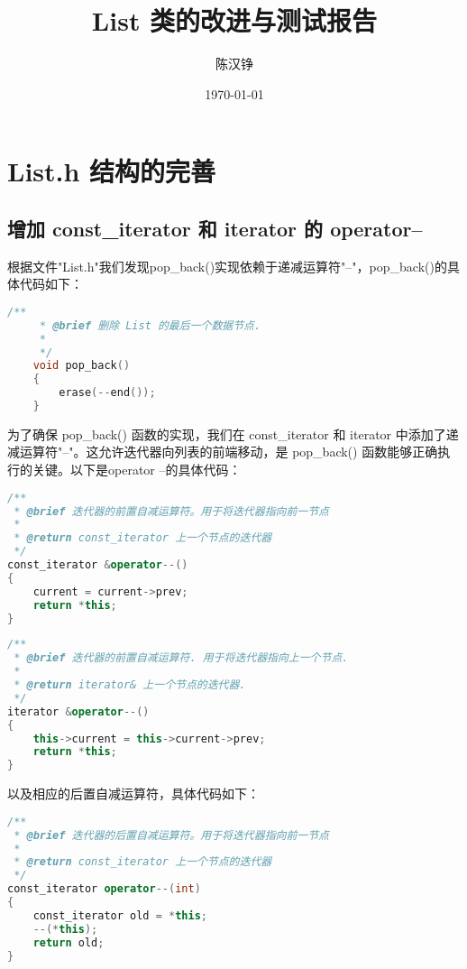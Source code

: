 \documentclass[fontset=fandol]{ctexart}
\title{List 类的改进与测试报告}
\author{陈汉铮}
\date{\today}
\begin{document}
  
  
\maketitle  
  
\section{List.h 结构的完善}  
\subsection{增加 const\_iterator 和 iterator 的 operator--} 
根据文件"List.h"我们发现pop\_back()实现依赖于递减运算符"--"，pop\_back()的具体代码如下：

\begin{lstlisting}[language=C++, caption={pop\_back}]  
/** 
     * @brief 删除 List 的最后一个数据节点.
     * 
     */
    void pop_back()
    {
        erase(--end());
    } 
\end{lstlisting}


为了确保 pop\_back() 函数的实现，我们在 const\_iterator 和 iterator 中添加了递减运算符"--"。这允许迭代器向列表的前端移动，是 pop\_back() 函数能够正确执行的关键。以下是operator --的具体代码：  
  
\begin{lstlisting}[language=C++, caption={const\_iterator的前置自减运算符实现}]  
/**  
 * @brief 迭代器的前置自减运算符。用于将迭代器指向前一节点  
 *  
 * @return const_iterator 上一个节点的迭代器  
 */  
const_iterator &operator--()  
{  
    current = current->prev;  
    return *this;  
}  
\end{lstlisting}


\begin{lstlisting}[language=C++, caption={iterator的前置自减运算符实现}]  
/**
 * @brief 迭代器的前置自减运算符. 用于将迭代器指向上一个节点.
 *
 * @return iterator& 上一个节点的迭代器.
 */
iterator &operator--()
{
    this->current = this->current->prev;
    return *this;
}  
\end{lstlisting}

以及相应的后置自减运算符，具体代码如下：

\begin{lstlisting}[language=C++, caption={const\_iterator的后置自减运算符实现}]  
/**
 * @brief 迭代器的后置自减运算符。用于将迭代器指向前一节点
 * 
 * @return const_iterator 上一个节点的迭代器
 */
const_iterator operator--(int)
{
    const_iterator old = *this;
    --(*this);
    return old;
}  
\end{lstlisting}
\end{document}
